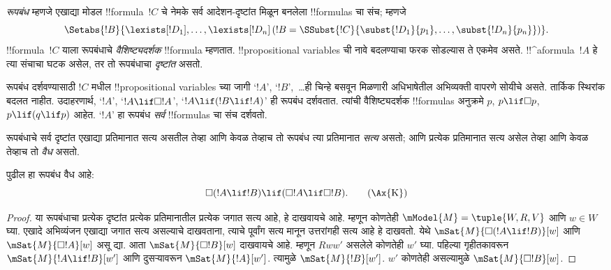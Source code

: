 \documentclass[../../../include/open-logic-section]{subfiles}
\begin{document}


\begin{defn}
  \emph{रूपबंध} म्हणजे एखाद्या मोडल !!{formula}~$!C$ चे
  नेमके सर्व आदेशन-दृष्टांत मिळून बनलेला !!{formula}s चा संच; म्हणजे
  \[
  \Setabs{!B}{\lexists[!D_1], \dots, \lexists[!D_n] \left(!B =
  \SSubst{!C}{\subst{!D_1}{p_1}, \dots, \subst{!D_n}{p_n}} \right) }.
  \]
  !!{formula}~$!C$ याला रूपबंधाचे \emph{वैशिष्ट्यदर्शक} !!{formula}
  म्हणतात. !!{propositional
  variable}s ची नावे बदलण्याचा फरक सोडल्यास ते एकमेव असते.
  !!^a{formula}~$!A$ हे त्या संचाचा घटक असेल, तर तो
  रूपबंधाचा \emph{दृष्टांत} असतो.
\end{defn}

रूपबंध दर्शवण्यासाठी $!C$ मधील !!{propositional variable}s च्या जागी
`$!A$', `$!B$',~\dots ही चिन्हे बसवून मिळणारी
अधिभाषेतील अभिव्यक्ती वापरणे सोयीचे असते. तार्किक स्थिरांक बदलत नाहीत. उदाहरणार्थ,
`$!A$', `$!A \lif \Box!A$', `$!A \lif (!B \lif !A)$'
ही रूपबंध दर्शवतात. त्यांची वैशिष्ट्यदर्शक !!{formula}s
अनुक्रमे $p$, $p \lif \Box p$, $p \lif (q
\lif p)$ आहेत. `$!A$' हा रूपबंध \emph{सर्व}
!!{formula}s चा संच दर्शवतो.

\begin{defn}
  रूपबंधाचे सर्व दृष्टांत एखाद्या प्रतिमानात सत्य असतील तेव्हा
  आणि केवळ तेव्हाच तो रूपबंध त्या प्रतिमानात \emph{सत्य}
  असतो; आणि प्रत्येक प्रतिमानात सत्य असेल तेव्हा आणि केवळ
  तेव्हाच तो \emph{वैध} असतो.
\end{defn}

\begin{prop}
  पुढील  हा रूपबंध वैध आहे:
  \begin{equation*}
  \Box(!A \lif !B) \lif (\Box !A \lif \Box !B). \tag{\Ax{K}}
  \end{equation*}
\end{prop}

\begin{proof}
  या रूपबंधाचा प्रत्येक दृष्टांत प्रत्येक प्रतिमानातील प्रत्येक
  जगात सत्य आहे, हे दाखवायचे आहे. म्हणून कोणतेही
  $\mModel{M} = \tuple{W,R,V}$ आणि $w \in W$ घ्या.
  एखादे अभिव्यंजन एखाद्या जगात सत्य असल्याचे दाखवताना,
  त्याचे पूर्वांग सत्य मानून उत्तरांगही सत्य आहे हे दाखवतो.
  येथे $\mSat{M}{\Box(!A \lif !B)}[w]$ आणि
  $\mSat{M}{\Box !A}[w]$ असू द्या. आता
  $\mSat{M}{\Box !B}[w]$ दाखवायचे आहे. म्हणून $Rww'$
  असलेले कोणतेही $w'$ घ्या. पहिल्या गृहीतकावरून
  $\mSat{M}{!A \lif !B}[w']$ आणि दुसऱ्यावरून
  $\mSat{M}{!A}[w']$. त्यामुळे $\mSat{M}{!B}[w']$.
  $w'$ कोणतेही असल्यामुळे $\mSat{M}{\Box !B}[w]$.
\end{proof}
\end{document}
